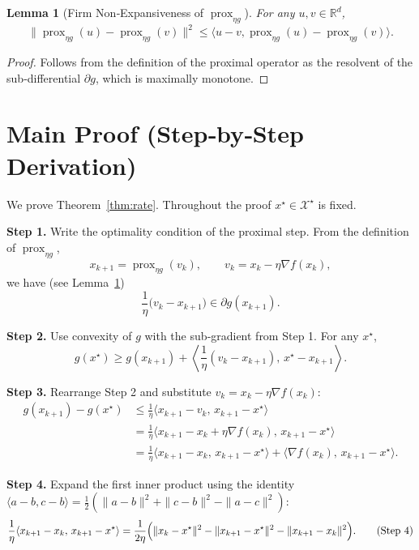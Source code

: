 \documentclass{article}
\newtheorem{lemma}{Lemma}
\newcommand{\prox}{\operatorname{prox}}
\newcommand{\R}{\mathbb{R}}
\begin{document}
\begin{lemma}[Firm Non‑Expansiveness of $\prox_{\eta g}$]
\label{lem:firm}
For any $u,v\in\R^{d}$,
\[
\|\prox_{\eta g}(u)-\prox_{\eta g}(v)\|^{2}
\le\langle u-v,\prox_{\eta g}(u)-\prox_{\eta g}(v)\rangle.
\tag{L2}
\]
\end{lemma}
\begin{proof}
Follows from the definition of the proximal operator as the resolvent of the sub‑differential $\partial g$, which is maximally monotone. \qedhere
\end{proof}

\section*{Main Proof (Step‑by‑Step Derivation)}
We prove Theorem~\ref{thm:rate}.  Throughout the proof $x^{\star}\in\mathcal{X}^{\star}$ is fixed.

\noindent\textbf{Step 1.} Write the optimality condition of the proximal step.  
From the definition of $\prox_{\eta g}$,
\[
x_{k+1}= \prox_{\eta g}(v_{k}),\qquad v_{k}=x_{k}-\eta\nabla f(x_{k}),
\]
we have (see Lemma~\ref{lem:firm})
\[
\frac{1}{\eta}\bigl(v_{k}-x_{k+1}\bigr)\in\partial g(x_{k+1}).
\tag{Step 1}
\]

\noindent\textbf{Step 2.} Use convexity of $g$ with the sub‑gradient from Step 1.
For any $x^{\star}$,
\[
g(x^{\star})\ge g(x_{k+1})+\left\langle\frac{1}{\eta}(v_{k}-x_{k+1}),\,x^{\star}-x_{k+1}\right\rangle.
\tag{Step 2}
\]

\noindent\textbf{Step 3.} Rearrange Step 2 and substitute $v_{k}=x_{k}-\eta\nabla f(x_{k})$:
\[
\begin{aligned}
g(x_{k+1})-g(x^{\star})
&\le\frac{1}{\eta}\langle x_{k+1}-v_{k},\,x_{k+1}-x^{\star}\rangle\\
&=\frac{1}{\eta}\langle x_{k+1}-x_{k}+\eta\nabla f(x_{k}),\,x_{k+1}-x^{\star}\rangle\\
&=\frac{1}{\eta}\langle x_{k+1}-x_{k},\,x_{k+1}-x^{\star}\rangle
   +\langle\nabla f(x_{k}),\,x_{k+1}-x^{\star}\rangle .
\end{aligned}
\tag{Step 3}
\]

\noindent\textbf{Step 4.} Expand the first inner product using the identity
$\langle a-b,c-b\rangle=\tfrac12(\|a-b\|^{2}+\|c-b\|^{2}-\|a-c\|^{2})$:
\[
\frac{1}{\eta}\langle x_{k+1}-x_{k},\,x_{k+1}-x^{\star}\rangle
=
\frac{1}{2\eta}\Bigl(\|x_{k}-x^{\star}\|^{2}
-\|x_{k+1}-x^{\star}\|^{2}
-\|x_{k+1}-x_{k}\|^{2}\Bigr).
\tag{Step 4}
\]
\end{document}
